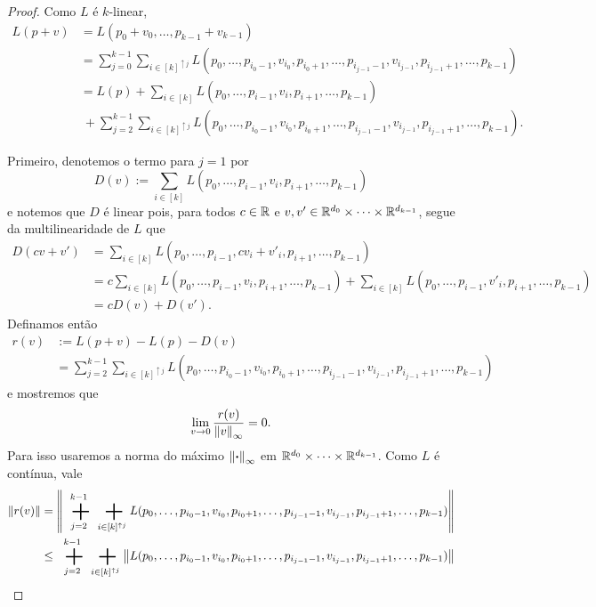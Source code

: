\begin{proof}
Como $L$ é $k$-linear,
	\begin{align*}
	L(p+v) &= L(p_0+v_0,\ldots,p_{k-1}+v_{k-1}) \\
			&= \sum_{j=0}^{k-1} \sum_{i \in [k]^{\uparrow j}} L(p_0,\ldots,p_{i_0-1},v_{i_0},p_{i_0+1},\ldots,p_{i_{j-1}-1},v_{i_{j-1}},p_{i_{j-1}+1},\ldots,p_{k-1}) \\
			&= L(p) + \sum_{i \in [k]} L(p_0,\ldots,p_{i-1},v_i,p_{i+1},\ldots,p_{k-1}) \\
			&\ + \sum_{j=2}^{k-1} \sum_{i \in [k]^{\uparrow j}} L(p_0,\ldots,p_{i_0-1},v_{i_0},p_{i_0+1},\ldots,p_{i_{j-1}-1},v_{i_{j-1}},p_{i_{j-1}+1},\ldots,p_{k-1}).
	\end{align*}

Primeiro, denotemos o termo para $j=1$ por
	\begin{equation*}
	D(v) := \sum_{i \in [k]} L(p_0,\ldots,p_{i-1},v_i,p_{i+1},\ldots,p_{k-1})
	\end{equation*}
e notemos que $D$ é linear pois, para todos $c \in \mathbb{R}$ e $v,v' \in \mathbb{R}^{d_0} \times \cdots \times \mathbb{R}^{d_{k-1}}$, segue da multilinearidade de $L$ que
	\begin{align*}
	D(cv+v') &= \sum_{i \in [k]} L(p_0,\ldots,p_{i-1},cv_i+v'_i,p_{i+1},\ldots,p_{k-1}) \\
		&= c\sum_{i \in [k]} L(p_0,\ldots,p_{i-1},v_i,p_{i+1},\ldots,p_{k-1}) + \sum_{i \in [k]} L(p_0,\ldots,p_{i-1},v'_i,p_{i+1},\ldots,p_{k-1}) \\
		&= cD(v)+D(v').
	\end{align*}
Definamos então
	\begin{align*}
	r(v) &:= L(p+v) - L(p) - D(v) \\
		&= \sum_{j=2}^{k-1} \sum_{i \in [k]^{\uparrow j}} L(p_0,\ldots,p_{i_0-1},v_{i_0},p_{i_0+1},\ldots,p_{i_{j-1}-1},v_{i_{j-1}},p_{i_{j-1}+1},\ldots,p_{k-1})
	\end{align*}
e mostremos que
	\begin{equation*}
	\lim_{v \to 0} \frac{r(v)}{\left\Vert{v}\right\Vert_{\infty}} = 0.
	\end{equation*}
Para isso usaremos a norma do máximo $\left\Vert{\bm{\cdot}}\right\Vert_\infty$ em $\mathbb{R}^{d_0} \times \cdots \times \mathbb{R}^{d_{k-1}}$. Como $L$ é contínua, vale
	\begin{align*}
	\nor{r(v)} &= \nor{\sum_{j=2}^{k-1} \sum_{i \in [k]^{\uparrow j}} L(p_0,\ldots,p_{i_0-1},v_{i_0},p_{i_0+1},\ldots,p_{i_{j-1}-1},v_{i_{j-1}},p_{i_{j-1}+1},\ldots,p_{k-1})} \\
		&\leq \sum_{j=2}^{k-1} \sum_{i \in [k]^{\uparrow j}} \nor{L(p_0,\ldots,p_{i_0-1},v_{i_0},p_{i_0+1},\ldots,p_{i_{j-1}-1},v_{i_{j-1}},p_{i_{j-1}+1},\ldots,p_{k-1})} \\

\end{align*}
\end{proof}
